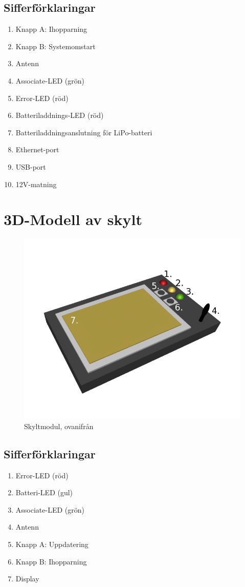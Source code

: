 \documentclass[a4paper,11pt]{article}
\begin{document}
\subsection{Sifferförklaringar}

\begin{enumerate}
\item Knapp A: Ihopparning
\item Knapp B: Systemomstart
\item Antenn
\item Associate-LED (grön)
\item Error-LED (röd)
\item Batteriladdnings-LED (röd)
\item Batteriladdningsanslutning för LiPo-batteri
\item Ethernet-port
\item USB-port  
\item 12V-matning
\end{enumerate}

\pagebreak

\section{3D-Modell av skylt}

\begin{figure}[H]
\begin{center}
\includegraphics[scale=0.5, angle=0]{drawing_skylt.png}
\end{center}
\label{fig:drawing_skylt}
\caption{Skyltmodul, ovanifrån}
\end{figure}

\subsection{Sifferförklaringar}

\begin{enumerate}
\item Error-LED (röd)
\item Batteri-LED (gul)
\item Associate-LED (grön)
\item Antenn
\item Knapp A: Uppdatering
\item Knapp B: Ihopparning
\item Display
\end{enumerate}
\pagebreak
\end{document}
